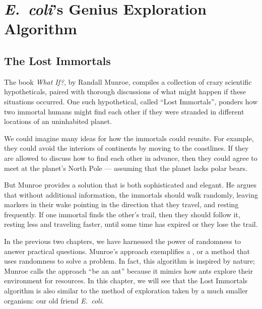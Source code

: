 \chapter[\textit{E.~coli}’s Genius Exploration Algorithm]{\textit{E.~coli}’s Genius Exploration Algorithm}
\label{chapter:chemotaxis}
\renewcommand{\chaptertitle}{E.~Coli's Genius Exploration Algorithm}

\FloatBarrier

\section{The Lost Immortals}
\label{sec:introduction}

The book \textit{What If?}, by Randall Munroe, compiles a collection of crazy scientific hypotheticals, paired with thorough discussions of what might happen if these situations occurred. One such hypothetical, called ``Lost Immortals'', ponders how two immortal humans might find each other if they were stranded in different locations of an uninhabited planet.

We could imagine many ideas for how the immortals could reunite. For example, they could avoid the interiors of continents by moving to the coastlines. If they are allowed to discuss how to find each other in advance, then they could agree to meet at the planet's North Pole --- assuming that the planet lacks polar bears.

But Munroe provides a solution that is both sophisticated and elegant. He argues that without additional information, the immortals should walk randomly, leaving markers in their wake pointing in the direction that they travel, and resting frequently. If one immortal finds the other's trail, then they should follow it, resting less and traveling faster, until some time has expired or they lose the trail.

In the previous two chapters, we have harnessed the power of randomness to answer practical questions. Munroe's approach exemplifies a , or a method that uses randomness to solve a problem. In fact, this algorithm is inspired by nature; Munroe calls the approach ``be an ant'' because it mimics how ants explore their environment for resources. In this chapter, we will see that the Lost Immortals algorithm is also similar to the method of exploration taken by a much smaller organism: our old friend \textit{E.~coli}.

